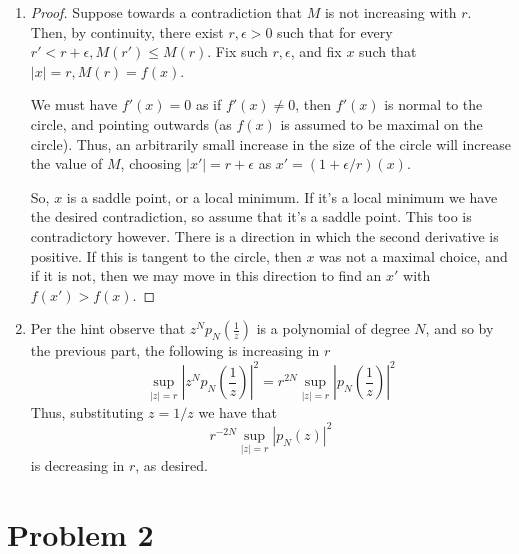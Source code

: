 \documentclass[11pt]{article}
\begin{document}
\begin{enumerate}
\begin{proof}
The number of connected components of the level curve $L_t = \{z \ : \ |p_N(z)|^2=t\} $ is the same as the number of local minima for some sufficiently small $t$ by definition of local minimum, together with the fact that all local minima have $f(m) =0$. 

As we increase $t$ the connected components grow, getting closer together until  they reach a member of $A$, where they are tangent at the saddle point. If the saddle point is a multiple root, then more than one connected component is tangent at the same point corresponding to the multiplicity of the root. 
\end{proof}
\item 
\begin{proof}
Suppose towards a contradiction that $M$ is not increasing with $r$. Then, by continuity, there exist $r, \epsilon >0$ such that for every $r' < r + \epsilon, M(r') \leq M(r)$. Fix such $r, \epsilon$, and fix $x$ such that $|x| = r, M(r) = f(x)$.

We must have $f'(x) = 0$ as if $f'(x)  \neq 0$, then $f'(x) $ is normal to the circle, and pointing outwards (as $f(x)$ is assumed to be maximal on the circle).  Thus, an arbitrarily small increase in the size of the circle will increase the value of $M$, choosing $|x'| = r + \epsilon$ as $x' = (1+\epsilon/r) (x)$.

So, $x$ is a saddle point, or a local minimum. If it's a local minimum we have the desired contradiction, so assume that it's a saddle point. This too is contradictory however. There is a direction in which the second derivative is positive. If this is tangent to the circle, then $x$ was not a maximal choice, and if it is not, then we may move in this direction to find an $x'$ with $f(x')> f(x)$.
\end{proof}
\item Per the hint observe that $z^N p_N(\frac{1}{z})$ is a polynomial of degree $N$, and so by the previous part, the following is increasing in $r$
\[\sup_{|z| =r} \left|z^N p_N\left(\frac{1}{z}\right)\right|^2 = r^{2N} \sup_{|z| =r}\left| p_N\left(\frac{1}{z}\right)\right|^2 \]
Thus, substituting $z = 1/z$ we have that 
\[ r^{-2N} \sup_{|z| =r} \left| p_N\left(z\right)\right|^2 \]
is decreasing in $r$, as desired.
\end{enumerate}


\section{Problem 2}
\end{document}
